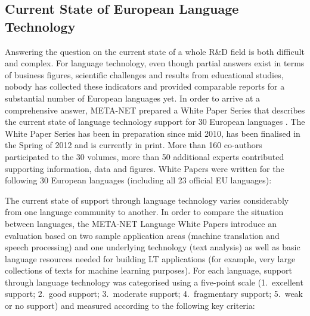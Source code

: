 \documentclass[10pt, plain]{../../metanetpaper}
\begin{document}
\begin{multicols}{2}

\subsection{Current State of European Language Technology}
\label{sec:what-current-state}


Answering the question on the current state of a whole R\&D field is both difficult and complex. For language technology, even though partial answers exist in terms of business figures, scientific challenges and results from educational studies, nobody has collected these indicators and provided comparable reports for a substantial number of European languages yet. In order to arrive at a comprehensive answer, META-NET prepared a White Paper Series that describes the current state of language technology support for 30 European languages \cite{LWP2012}. The White Paper Series has been in preparation since mid 2010, has been finalised in the Spring of 2012 and is currently in print. More than 160 co-authors participated to the 30 volumes, more than 50 additional experts contributed supporting information, data and figures. White Papers were written for the following 30 European languages (including all 23 official EU languages):

\medskip
\centerline{}

\medskip 
The current state of support through language technology varies considerably from one language community to another. In order to compare the situation between languages, the META-NET Language White Papers introduce an evaluation based on two sample application areas (machine translation and speech processing) and one underlying technology (text analysis) as well as basic language resources needed for building LT applications (for example, very large collections of texts for machine learning purposes). For each language, support through language technology was categorised using a five-point scale (1.~excellent support; 2.~good support; 3.~moderate support; 4.~fragmentary support; 5.~weak or no support) and measured according to the following key criteria:


\end{multicols}
\end{document}
